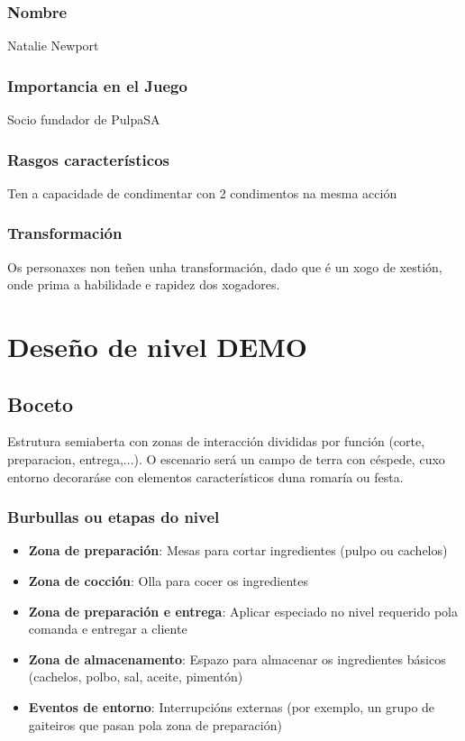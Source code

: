 \documentclass{report}  %
\begin{document}
\subsubsection{Nombre}
Natalie Newport
\subsubsection{Importancia en el Juego}
Socio fundador de PulpaSA \footnotemark[1]
\subsubsection{Rasgos característicos}
Ten a capacidade de condimentar con 2 condimentos na mesma acción \footnotemark[2]
\subsubsection{Transformación}
Os personaxes non teñen unha transformación, dado que é un xogo de xestión, onde prima a habilidade e rapidez dos xogadores.


\newpage
\section{Deseño de nivel DEMO}
\subsection{Boceto}
Estrutura semiaberta con zonas de interacción divididas por función (corte, preparacion, entrega,...). O escenario
será un campo de terra con céspede, cuxo entorno decoraráse con elementos característicos duna romaría ou festa.

\subsubsection{Burbullas ou etapas do nivel}
\begin{itemize}
    \item \textbf{Zona de preparación}: Mesas para cortar ingredientes (pulpo ou cachelos)
    \item \textbf{Zona de cocción}: Olla para cocer os ingredientes
    \item \textbf{Zona de preparación e entrega}: Aplicar especiado no nivel requerido pola comanda e entregar a cliente
    \item \textbf{Zona de almacenamento}: Espazo para almacenar os ingredientes básicos (cachelos, polbo, sal, aceite, pimentón)
    \item \textbf{Eventos de entorno}: Interrupcións externas (por exemplo, un grupo de gaiteiros que pasan pola zona de preparación)
\end{itemize}
\end{document}

